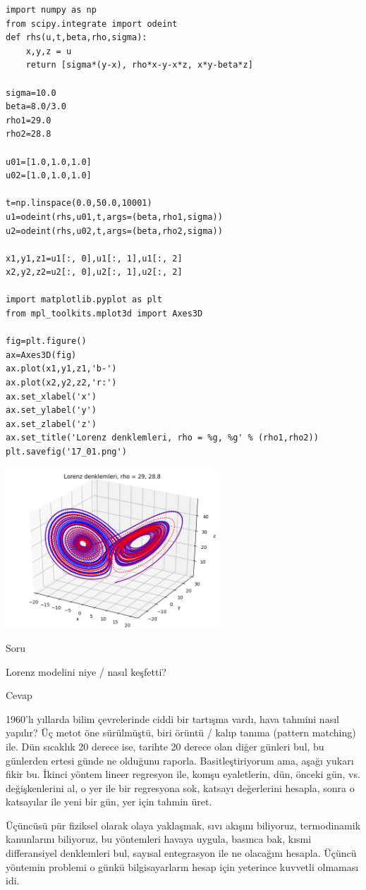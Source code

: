 \documentclass[12pt,fleqn]{article}\usepackage{../../common}
\begin{document}
\begin{verbatim}
import numpy as np
from scipy.integrate import odeint
def rhs(u,t,beta,rho,sigma):
    x,y,z = u
    return [sigma*(y-x), rho*x-y-x*z, x*y-beta*z]

sigma=10.0
beta=8.0/3.0
rho1=29.0
rho2=28.8

u01=[1.0,1.0,1.0]
u02=[1.0,1.0,1.0]

t=np.linspace(0.0,50.0,10001)
u1=odeint(rhs,u01,t,args=(beta,rho1,sigma))
u2=odeint(rhs,u02,t,args=(beta,rho2,sigma))

x1,y1,z1=u1[:, 0],u1[:, 1],u1[:, 2]
x2,y2,z2=u2[:, 0],u2[:, 1],u2[:, 2]

import matplotlib.pyplot as plt
from mpl_toolkits.mplot3d import Axes3D

fig=plt.figure()
ax=Axes3D(fig)
ax.plot(x1,y1,z1,'b-')
ax.plot(x2,y2,z2,'r:')
ax.set_xlabel('x')
ax.set_ylabel('y')
ax.set_zlabel('z')
ax.set_title('Lorenz denklemleri, rho = %g, %g' % (rho1,rho2))
plt.savefig('17_01.png')
\end{verbatim}

\includegraphics[height=6cm]{17_01.png}

Soru

Lorenz modelini niye / nasıl keşfetti? 

Cevap

1960'lı yıllarda bilim çevrelerinde ciddi bir tartışma vardı, hava tahmini
nasıl yapılır? Üç metot öne sürülmüştü, biri örüntü / kalıp tanıma (pattern
matching) ile. Dün sıcaklık 20 derece ise, tarihte 20 derece olan diğer
günleri bul, bu günlerden ertesi günde ne olduğunu
raporla. Basitleştiriyorum ama, aşağı yukarı fikir bu. İkinci yöntem lineer
regresyon ile, komşu eyaletlerin, dün, önceki gün, vs. değişkenlerini al, o
yer ile bir regresyona sok, katsayı değerlerini hesapla, sonra o katsayılar
ile yeni bir gün, yer için tahmin üret.

Üçüncüsü pür fiziksel olarak olaya yaklaşmak, sıvı akışını biliyoruz,
termodinamik kanunlarını biliyoruz, bu yöntemleri havaya uygula, basınca
bak, kısmi differansiyel denklemleri bul, sayısal entegrasyon ile ne
olacağını hesapla. Üçüncü yöntemin problemi o günkü bilgisayarların hesap
için yeterince kuvvetli olmaması idi.
\end{document}
